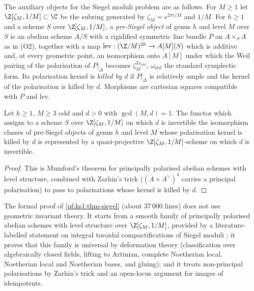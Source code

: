 The auxiliary objects for the Siegel moduli problem are as follows. For $M\ge1$ let
$\Z[\zeta_M,1/M]\subset\C$ be the subring generated by $\zeta_M=e^{2\pi i/M}$ and $1/M$. For $h\ge1$ and a
scheme $S$ over $\Z[\zeta_M,1/M]$, a \emph{pre-Siegel object} of genus $h$ and level $M$ over $S$ is an abelian
scheme $A/S$ with a rigidified symmetric line bundle $P$ on $A\times_SA$ as in (O2), together with a map
$\mathrm{lev}:(\Z/M)^{2h}\to A[M](S)$ which is additive and, at every geometric point, an isomorphism onto
$A[M]$ under which the Weil pairing of the polarisation of $P|_\Delta$ becomes $\zeta_M^{2\omega_{\mathrm{std}}}$,
$\omega_{\mathrm{std}}$ the standard symplectic form. Its polarisation kernel is \emph{killed by $d$} if
$P|_{\Delta}$ is relatively ample and the kernel of the polarisation is killed by $d$. Morphisms are cartesian
squares compatible with $P$ and $\mathrm{lev}$.

\begin{theorem}\label{pf:ks1:thm-siegel}
Let $h\ge1$, $M\ge3$ odd and $d>0$ with $\gcd(M,d)=1$. The functor which assigns to a scheme $S$ over
$\Z[\zeta_M,1/M]$ on which $d$ is invertible the isomorphism classes of pre-Siegel objects of genus $h$ and
level $M$ whose polarisation kernel is killed by $d$ is represented by a quasi-projective
$\Z[\zeta_M,1/M]$-scheme on which $d$ is invertible.
\end{theorem}

\begin{proof}
This is Mumford's theorem \cite[Ch.~7]{MumfordFogartyKirwan1994} for principally polarised
abelian schemes with level structure, combined with Zarhin's trick \cite{Zarhin1977}
($(A\times A^\vee)^4$ carries a principal polarisation) to pass to polarisations whose kernel is killed by $d$.
\end{proof}

\begin{remark}\label{pf:ks1:rem-siegel}
The formal proof of \cref{pf:ks1:thm-siegel} (about $37\,000$ lines) does not use geometric invariant
theory. It starts from a smooth family of principally polarised abelian schemes with level structure over
$\Z[\zeta_M,1/M]$, provided by a literature-labelled statement on integral toroidal compactifications of
Siegel moduli \cite{FaltingsChai1990}; it proves that this family is universal by deformation theory
(classification over algebraically closed fields, lifting to Artinian, complete Noetherian local, Noetherian
local and Noetherian bases, and gluing); and it treats non-principal polarisations by Zarhin's trick and an
open-locus argument for images of idempotents.
\end{remark}

